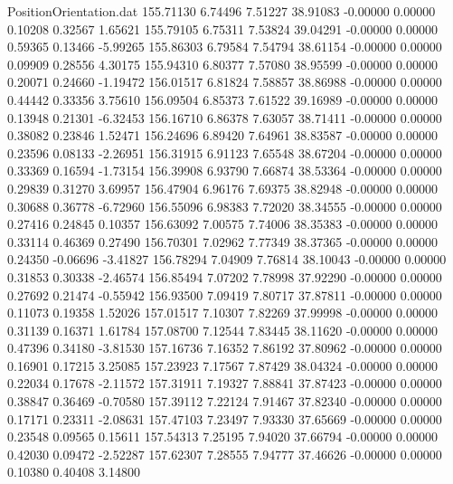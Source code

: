 \begin{filecontents}{PositionOrientation.dat}
 155.71130    6.74496    7.51227    38.91083   -0.00000    0.00000    0.10208    0.32567    1.65621
 155.79105    6.75311    7.53824    39.04291   -0.00000    0.00000    0.59365    0.13466   -5.99265
 155.86303    6.79584    7.54794    38.61154   -0.00000    0.00000    0.09909    0.28556    4.30175
 155.94310    6.80377    7.57080    38.95599   -0.00000    0.00000    0.20071    0.24660   -1.19472
 156.01517    6.81824    7.58857    38.86988   -0.00000    0.00000    0.44442    0.33356    3.75610
 156.09504    6.85373    7.61522    39.16989   -0.00000    0.00000    0.13948    0.21301   -6.32453
 156.16710    6.86378    7.63057    38.71411   -0.00000    0.00000    0.38082    0.23846    1.52471
 156.24696    6.89420    7.64961    38.83587   -0.00000    0.00000    0.23596    0.08133   -2.26951
 156.31915    6.91123    7.65548    38.67204   -0.00000    0.00000    0.33369    0.16594   -1.73154
 156.39908    6.93790    7.66874    38.53364   -0.00000    0.00000    0.29839    0.31270    3.69957
 156.47904    6.96176    7.69375    38.82948   -0.00000    0.00000    0.30688    0.36778   -6.72960
 156.55096    6.98383    7.72020    38.34555   -0.00000    0.00000    0.27416    0.24845    0.10357
 156.63092    7.00575    7.74006    38.35383   -0.00000    0.00000    0.33114    0.46369    0.27490
 156.70301    7.02962    7.77349    38.37365   -0.00000    0.00000    0.24350   -0.06696   -3.41827
 156.78294    7.04909    7.76814    38.10043   -0.00000    0.00000    0.31853    0.30338   -2.46574
 156.85494    7.07202    7.78998    37.92290   -0.00000    0.00000    0.27692    0.21474   -0.55942
 156.93500    7.09419    7.80717    37.87811   -0.00000    0.00000    0.11073    0.19358    1.52026
 157.01517    7.10307    7.82269    37.99998   -0.00000    0.00000    0.31139    0.16371    1.61784
 157.08700    7.12544    7.83445    38.11620   -0.00000    0.00000    0.47396    0.34180   -3.81530
 157.16736    7.16352    7.86192    37.80962   -0.00000    0.00000    0.16901    0.17215    3.25085
 157.23923    7.17567    7.87429    38.04324   -0.00000    0.00000    0.22034    0.17678   -2.11572
 157.31911    7.19327    7.88841    37.87423   -0.00000    0.00000    0.38847    0.36469   -0.70580
 157.39112    7.22124    7.91467    37.82340   -0.00000    0.00000    0.17171    0.23311   -2.08631
 157.47103    7.23497    7.93330    37.65669   -0.00000    0.00000    0.23548    0.09565    0.15611
 157.54313    7.25195    7.94020    37.66794   -0.00000    0.00000    0.42030    0.09472   -2.52287
 157.62307    7.28555    7.94777    37.46626   -0.00000    0.00000    0.10380    0.40408    3.14800

\end{filecontents}
